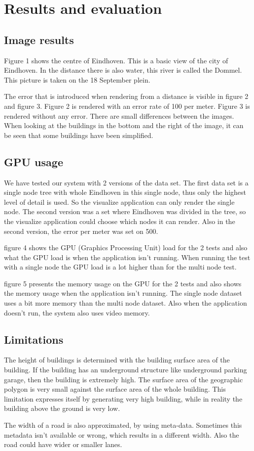 \chapter{Results and evaluation}
\label{chap:ResultsAndEvaluation}
\section{Image results}
\label{sec:ImageResults}
Figure 1 shows the centre of Eindhoven. This is a basic view of the city of Eindhoven. In the distance there is also water, this river is called the Dommel. This picture is taken on the 18 September plein.

The error that is introduced when rendering from a distance is visible in figure 2 and figure 3. Figure 2 is rendered with an error rate of 100 per meter. Figure 3 is rendered without any error. There are small differences between the images. When looking at the buildings in the bottom and the right of the image, it can be seen that some buildings have been simplified.

\section{GPU usage}
\label{sec:GPUUsage}
We have tested our system with 2 versions of the data set. The first data set is a single node tree with whole Eindhoven in this single node, thus only the highest level of detail is used. So the visualize application can only render the single node. The second version was a set where Eindhoven was divided in the tree, so the visualize application could choose which nodes it can render. Also in the second version, the error per meter was set on 500.

figure 4 shows the GPU (Graphics Processing Unit) load for the 2 tests and also what the GPU load is when the application isn’t running. When running the test with a single node the GPU load is a lot higher than for the multi node test.

figure 5 presents the memory usage on the GPU for the 2 tests and also shows the memory usage when the application isn’t running. The single node dataset uses a bit more memory than the multi node dataset. Also when the application doesn’t run, the system also uses video memory.

\section{Limitations}
\label{sec:Limitations}
The height of buildings is determined with the building surface area of the building. If the building has an underground structure like underground parking garage, then the building is extremely high. The surface area of the geographic polygon is very small against the surface area of the whole building. This limitation expresses itself by generating very high building, while in reality the building above the ground is very low.

The width of a road is also approximated, by using meta-data. Sometimes this metadata isn’t available or wrong, which results in a different width. Also the road could have wider or smaller lanes.

